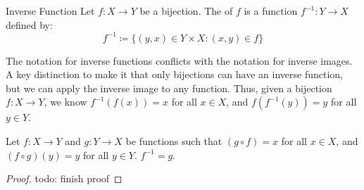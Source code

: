 \begin{dfnbox}{Inverse Function}{}
    Let $f : X \to Y$ be a bijection. The  of $f$ is a function $f^{-1} : Y \to X$ defined by:
    \[ f^{-1} \coloneq \{ (y,x) \in Y \times X : (x,y) \in f \} \]
\end{dfnbox}

The notation for inverse functions conflicts with the notation for inverse images. A key distinction to make it that only bijections can have an inverse function, but we can apply the inverse image to any function. Thus, given a bijection $f : X \to Y$, we know $f^{-1}(f(x)) = x$ for all $x \in X$, and $f(f^{-1}(y)) = y$ for all $y \in Y$.

\begin{exbox}{}{}
    Let $f : X \to Y$ and $g : Y \to X$ be functions such that $(g \circ f) = x$ for all $x \in X$, and $(f \circ g)(y) = y$ for all $y \in Y$. $f^{-1} = g$.
    \tcblower
    \begin{proof}
        todo: finish proof
    \end{proof}
\end{exbox}
